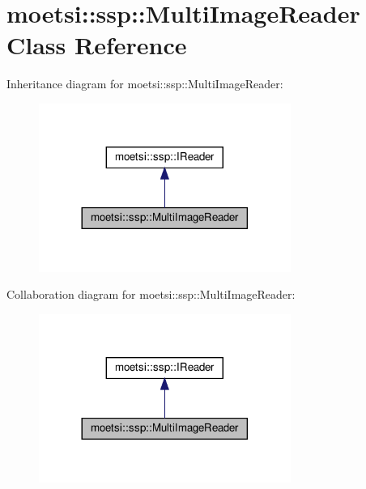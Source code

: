 \hypertarget{classmoetsi_1_1ssp_1_1MultiImageReader}{}\section{moetsi\+:\+:ssp\+:\+:Multi\+Image\+Reader Class Reference}
\label{classmoetsi_1_1ssp_1_1MultiImageReader}


Inheritance diagram for moetsi\+:\+:ssp\+:\+:Multi\+Image\+Reader\+:\nopagebreak
\begin{figure}[H]
\begin{center}
\leavevmode
\includegraphics[width=233pt]{classmoetsi_1_1ssp_1_1MultiImageReader__inherit__graph}
\end{center}
\end{figure}


Collaboration diagram for moetsi\+:\+:ssp\+:\+:Multi\+Image\+Reader\+:\nopagebreak
\begin{figure}[H]
\begin{center}
\leavevmode
\includegraphics[width=233pt]{classmoetsi_1_1ssp_1_1MultiImageReader__coll__graph}
\end{center}
\end{figure}

